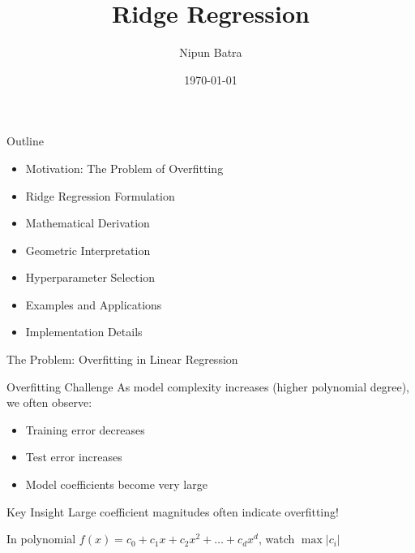 \documentclass{beamer}
\title{Ridge Regression}
\date{\today}
\author{Nipun Batra}
\institute{IIT Gandhinagar}
\begin{document}
  \maketitle

\begin{frame}{Outline}
\begin{itemize}
\item Motivation: The Problem of Overfitting
\item Ridge Regression Formulation
\item Mathematical Derivation
\item Geometric Interpretation  
\item Hyperparameter Selection
\item Examples and Applications
\item Implementation Details
\end{itemize}
\end{frame}

\begin{frame}{The Problem: Overfitting in Linear Regression}
\begin{alertbox}{Overfitting Challenge}
As model complexity increases (higher polynomial degree), we often observe:
\begin{itemize}
\item Training error decreases
\item Test error increases  
\item Model coefficients become very large
\end{itemize}
\end{alertbox}
\pause

\begin{keypointsbox}{Key Insight}
Large coefficient magnitudes often indicate overfitting!
\end{keypointsbox}
\pause

In polynomial $f(x) = c_0 + c_1x + c_2x^2 + \dots + c_dx^d$, watch $\max|c_i|$
\end{frame}
  
\end{document}
